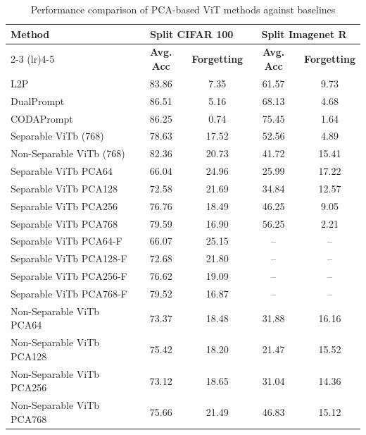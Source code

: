 \begin{table}[h]
	\centering
	\caption{Performance comparison of PCA-based ViT methods against baselines}
	\label{tab:pca_results}
	\begin{tabular}{lcccc}
		\toprule
		\multirow{2}{*}{\textbf{Method}} & \multicolumn{2}{c}{\textbf{Split CIFAR 100}} & \multicolumn{2}{c}{\textbf{Split Imagenet R}} \\
		\cmidrule(lr){2-3} \cmidrule(lr){4-5}
		& \textbf{Avg. Acc} & \textbf{Forgetting} & \textbf{Avg. Acc} & \textbf{Forgetting} \\
		\midrule
		L2P & 83.86 & 7.35 & 61.57 & 9.73 \\
		DualPrompt & 86.51 & 5.16 & 68.13 & 4.68 \\
		CODAPrompt & 86.25 & 0.74 & 75.45 & 1.64 \\
		\midrule
		Separable ViTb (768) & 78.63 & 17.52 & 52.56 & 4.89 \\
		Non-Separable ViTb (768) & 82.36 & 20.73 & 41.72 & 15.41 \\
		\midrule
		Separable ViTb PCA64 & 66.04 & 24.96 & 25.99 & 17.22 \\
		Separable ViTb PCA128 & 72.58 & 21.69 & 34.84 & 12.57 \\
		Separable ViTb PCA256 & 76.76 & 18.49 & 46.25 & 9.05 \\
		Separable ViTb PCA768 & 79.59 & 16.90 & 56.25 & 2.21 \\
		\midrule
		Separable ViTb PCA64-F & 66.07 & 25.15 & -- & -- \\
		Separable ViTb PCA128-F & 72.68 & 21.80 & -- & -- \\
		Separable ViTb PCA256-F & 76.62 & 19.09 & -- & -- \\
		Separable ViTb PCA768-F & 79.52 & 16.87 & -- & -- \\
		\midrule
		Non-Separable ViTb PCA64 & 73.37 & 18.48 & 31.88 & 16.16 \\
		Non-Separable ViTb PCA128 & 75.42 & 18.20 & 21.47 & 15.52 \\
		Non-Separable ViTb PCA256 & 73.12 & 18.65 & 31.04 & 14.36 \\
		Non-Separable ViTb PCA768 & 75.66 & 21.49 & 46.83 & 15.12 \\
		\bottomrule
	\end{tabular}
\end{table}

